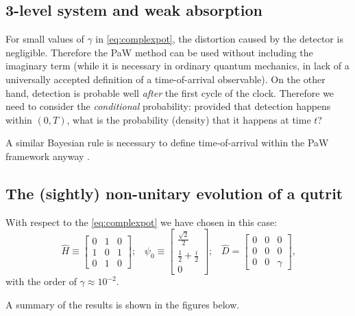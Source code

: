 \documentclass[landscape]{a0poster}
\DeclareMathOperator*{\repr}{\equiv}      %
\begin{document}
\begin{multicols}{3}
\section*{3-level system and weak absorption}

For small values of $\gamma$ in \eqref{eq:complexpot},
the distortion caused by the detector is negligible.
Therefore the PaW method can be used without including the imaginary term
(while it is necessary in ordinary quantum mechanics,
in lack of a universally accepted definition of a time-of-arrival observable).
On the other hand, detection is probable well \emph{after} the first cycle of the clock.
Therefore we need to consider the \emph{conditional} probability: provided that detection happens
within $(0, T)$, what is the probability (density) that it happens at time $t$?

A similar Bayesian rule is necessary to define time-of-arrival within the PaW framework
anyway \parencite{Maccone:QMOT}.

\subsection*{The (sightly) non-unitary evolution of a qutrit}
With respect to the \eqref{eq:complexpot} we have chosen in this case:
\begin{equation}
  \hat{H} \repr \left[\begin{matrix}0 & 1 & 0\\1 & 0 & 1\\0 & 1 & 0\end{matrix}\right] \text{;} \quad
  \psi_0 \repr \left[\begin{matrix}\frac{\sqrt{2}}{2}\\\frac{1}{2} + \frac{i}{2}\\0\end{matrix}\right] \text{;} \quad
  \hat{D} = \left[\begin{matrix}0 & 0 & 0\\0 & 0 & 0\\0 & 0 & \gamma\end{matrix}\right] \text{,}
\end{equation}
with the order of $\gamma \approx 10^{-2}$.

A summary of the results is shown in the figures below.
\vspace{0.5cm}


\end{multicols}
\end{document}
